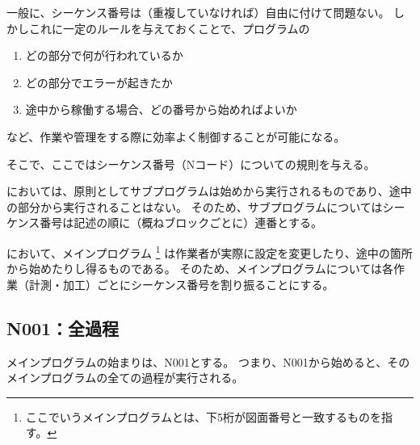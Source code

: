 


一般に、シーケンス番号は（重複していなければ）自由に付けて問題ない。
しかしこれに一定のルールを与えておくことで、プログラムの
\begin{enumerate}
\item どの部分で何が行われているか
\item どの部分でエラーが起きたか
\item 途中から稼働する場合、どの番号から始めればよいか
\end{enumerate}
など、作業や管理をする際に効率よく制御することが可能になる。

そこで、ここではシーケンス番号（Nコード）についての規則を与える。


\DMname においては、原則としてサブプログラムは始めから実行されるものであり、途中の部分から実行されることはない。
そのため、サブプログラムについてはシーケンス番号は記述の順に（概ねブロックごとに）連番とする。


\DMname において、メインプログラム
\footnote{ここでいうメインプログラムとは、下5桁が図面番号と一致するものを指す。}
は作業者が実際に設定を変更したり、途中の箇所から始めたりし得るものである。
そのため、メインプログラムについては各作業（計測・加工）ごとにシーケンス番号を割り振ることにする。


\subsection{N001：全過程}
メインプログラムの始まりは、N001とする。
つまり、N001から始めると、そのメインプログラムの全ての過程が実行される。


